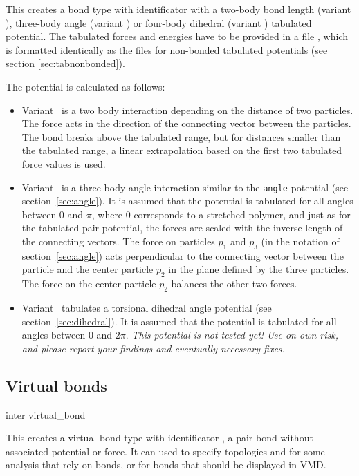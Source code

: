 This creates a bond type with identificator  with a
two-body bond length (variant ), three-body angle (variant
) or four-body dihedral (variant ) tabulated
potential. The tabulated forces and energies have to be provided in a
file , which is formatted identically as the files for
non-bonded tabulated potentials (see section \ref{sec:tabnonbonded}).

The potential is calculated as follows:
\begin{itemize}
\item Variant~ is a two body interaction depending on the distance of
  two particles. The force acts in the direction of the connecting vector
  between the particles. The bond breaks above the tabulated range, but for
  distances smaller than the tabulated range, a linear extrapolation based on
  the first two tabulated force values is used.
\item Variant~ is a three-body angle interaction similar to the
  \texttt{angle} potential (see section~\ref{sec:angle}).  It is assumed that
  the potential is tabulated for all angles between 0 and $ \pi $, where 0
  corresponds to a stretched polymer, and just as for the tabulated pair
  potential, the forces are scaled with the inverse length of the connecting
  vectors. The force on particles $p_1$ and $p_3$ (in the notation of
  section~\ref{sec:angle}) acts perpendicular to the connecting vector between
  the particle and the center particle $p_2$ in the plane defined by the three
  particles. The force on the center particle $p_2$ balances the other two
  forces.
\item Variant~ tabulates a torsional dihedral angle potential (see
  section~\ref{sec:dihedral}). It is assumed that the potential is tabulated for
  all angles between 0 and $2\pi$. \em{This potential is not tested yet! Use on
    own risk, and please report your findings and eventually necessary fixes.}
\end{itemize}

\subsection{Virtual bonds}
\begin{essyntax}
  inter  virtual_bond
\end{essyntax}

This creates a virtual bond type with identificator , \ie
a pair bond without associated potential or force. It can used to specify
topologies and for some analysis that rely on bonds, or \eg for bonds that
should be displayed in VMD.

